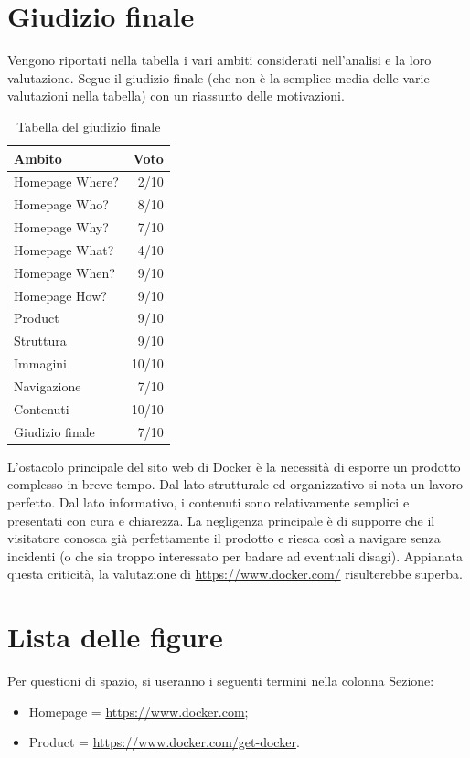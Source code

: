 \documentclass[a4paper]{article}
\begin{document}
\section{Giudizio finale}
Vengono riportati nella tabella i vari ambiti considerati nell'analisi e la loro valutazione. Segue il giudizio finale (che non è la semplice media delle varie valutazioni nella tabella) con un riassunto delle motivazioni.

\begin{table}[H]
\centering
\begin{tabular}{||l|r||}
\hline
Ambito & Voto \\ [0.5ex]
\hline \hline
Homepage Where? & 2/10 \\
Homepage Who? & 8/10 \\
Homepage Why? & 7/10 \\
Homepage What? & 4/10 \\
Homepage When? & 9/10 \\
Homepage How? & 9/10 \\
Product & 9/10 \\
Struttura & 9/10 \\
Immagini & 10/10 \\
Navigazione & 7/10 \\
Contenuti & 10/10 \\ [1.5ex]
Giudizio finale & 7/10 \\
\hline
\end{tabular}
\caption{Tabella del giudizio finale}
\end{table}

L'ostacolo principale del sito web di Docker è la necessità di esporre un prodotto complesso in breve tempo. Dal lato strutturale ed organizzativo si nota un lavoro perfetto. Dal lato informativo, i contenuti sono relativamente semplici e presentati con cura e chiarezza. La negligenza principale è di supporre che il visitatore conosca già perfettamente il prodotto e riesca così a navigare senza incidenti (o che sia troppo interessato per badare ad eventuali disagi). Appianata questa criticità, la valutazione di \url{https://www.docker.com/} risulterebbe superba.

\newpage
\section{Lista delle figure}

Per questioni di spazio, si useranno i seguenti termini nella colonna Sezione:
\begin{itemize}
	\item Homepage = \url{https://www.docker.com};
    \item Product = \url{https://www.docker.com/get-docker}.
\end{itemize}
\end{document}
